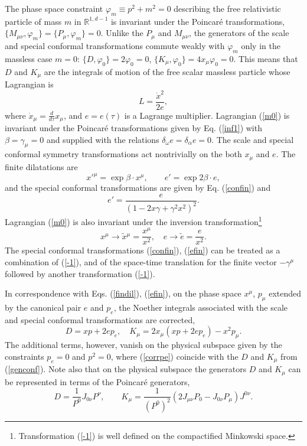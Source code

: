 \documentclass[a4paper,12pt]{article}
\def\R{\mathbb R}
\begin{document}
The phase space constraint
$
\varphi_m\equiv p^2+m^2=0
$
describing the
free relativistic particle of mass $m$
in $\R^{1,d-1}$ is invariant under the Poincar\'e
transformations, $\{M_{\mu\nu},\varphi_m\}=
\{P_\mu,\varphi_m\}=0$.
Unlike the $P_\mu$ and $M_{\mu\nu}$,
the generators
of the scale and special conformal transformations
commute weakly with $\varphi_m$ only in the
massless case $m=0$:
$\{D,\varphi_0\}=2\varphi_0=0$,
$\{K_\mu,\varphi_0\}=4x_\mu\varphi_0=0$.
This means that $D$ and $K_\mu$ are the integrals of
motion of the free scalar massless particle
whose Lagrangian is
\begin{equation}
L=\frac{\dot{x}^2}{2e},
\label{m0}
\end{equation}
where $\dot x_\mu=\frac{d}{d\tau}x_\mu$,
and $e=e(\tau)$ is a Lagrange multiplier.
Lagrangian (\ref{m0}) is
invariant under the Poincar\'e transformations
given by Eq. (\ref{inf1}) with
$\beta=\gamma_\mu=0$ and supplied with the
relations $\delta_\omega e=\delta_\alpha e=0$.
The scale and special conformal symmetry
transformations act nontrivially
on the both $x_\mu$ and $e$.
The finite dilatations are
\begin{equation}
x'^\mu=\exp\beta \cdot x^\mu,
\qquad
e'=\exp 2\beta \cdot e,
\label{findil}
\end{equation}
and the
special conformal
transformations are given by
Eq. (\ref{confin})
and
\begin{equation}
e'=\frac{e}{(1-2x\gamma+\gamma^2 x^2)^2}.
\label{efin}
\end{equation}
Lagrangian (\ref{m0})
is also invariant under the inversion
transformation\footnote{Transformation (\ref{-1})
is well defined on the compactified
Minkowski space.}
\begin{equation}
x^\mu \rightarrow \tilde{x}{}^\mu=\frac{x^\mu}{x^2},\quad
e\rightarrow \tilde e=\frac{e}{x^2}.
\label{-1}
\end{equation}
The special conformal
transformations (\ref{confin}),
(\ref{efin})
can be treated as
a combination of
(\ref{-1}),
and of the space-time translation for the finite vector
$-\gamma^\mu$
followed by another transformation (\ref{-1}).


In correspondence
with Eqs. (\ref{findil}), (\ref{efin}),
on the phase space
$x^\mu$, $p_\mu$
extended by the canonical pair
$e$ and $p_e$,
the Noether integrals associated with the
scale and special conformal transformations
are corrected,
\begin{equation}
D=xp+2ep_e,\quad K_\mu=2x_{\mu }(xp+2ep_e)-x^{2}p_{\mu }.
\label{corrpe}
\end{equation}
The additional terms, however, vanish on the physical
subspace given
by the constraints
$p_e=0$ and  $p^2=0$,
where (\ref{corrpe}) coincide with the $D$ and $K_\mu$ from
(\ref{genconf}).
Note also that on the physical subspace
the generators $D$ and $K_\mu$
can be represented in terms of the Poincar\'e generators,
$$
D=\frac{1}{P^0}J_{0\nu}P^\nu,\qquad
K_\mu=\frac{1}{(P^0)^2}(2J_{\mu\nu}P_0-
J_{0\nu}P_\mu)J^{0\nu}.
$$
\end{document}
